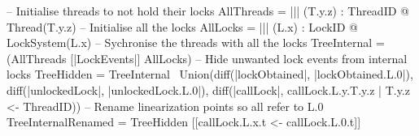 \begin{cspm}
  -- Initialise threads to not hold their locks
  AllThreads = ||| (T.y.z) : ThreadID @ Thread(T.y.z)
  -- Initialise all the locks
  AllLocks = ||| (L.x) : LockID @ LockSystem(L.x)
  -- Sychronise the threads with all the locks
  TreeInternal = (AllThreads [|LockEvents|] AllLocks)
  -- Hide unwanted lock events from internal locks
  TreeHidden = TreeInternal \ Union(diff({|lockObtained|}, {|lockObtained.L.0|}), 
                                     diff({|unlockedLock|}, {|unlockedLock.L.0|}),
                                     diff({|callLock|}, 
                                            {callLock.L.y.T.y.z | T.y.z <- ThreadID}))
  -- Rename linearization points so all refer to L.0
  TreeInternalRenamed = TreeHidden [[callLock.L.x.t <- callLock.L.0.t]]
\end{cspm}

